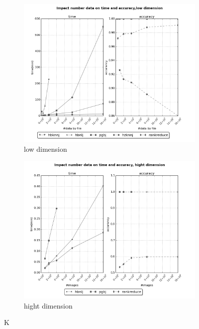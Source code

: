 \documentclass[10pt,a4paper]{article}
\begin{document}
  \begin{figure}[ht]
  \centering
 	  \begin{subfigure}[b]{0.4\textwidth}
                 \includegraphics[width=\textwidth]{../graph/geo/time.png} 
                \caption{low dimension}
        \end{subfigure}%
        \begin{subfigure}[b]{0.4\textwidth}
                 \includegraphics[width=\textwidth]{../graph/surf/time.png} 
                \caption{hight dimension}
        \end{subfigure}%
        \caption{K}
  \end{figure}
  
\end{document}
